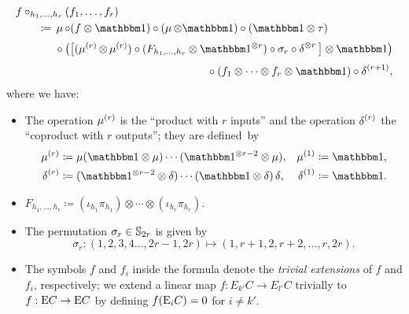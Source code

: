 \documentclass[\MainFolder/Text.tex]{subfiles}
\begin{document}
\begin{Definition}
\begin{equation} \label{Eq:CompositionFormula}
\begin{aligned}
&f\circ_{h_1, \dotsc, h_r}(f_1, \dotsc, f_r)\\
&\qquad \coloneqq \begin{multlined}[t]
\Prod\circ (f\otimes \Id)\circ(\Prod\otimes\Id)\circ(\Id\otimes \tau) \\[\jot] \circ \big(\big[(\Prod^{(r)}\otimes \Prod^{(r)})\circ (F_{h_1,\dotsc,h_r} \otimes \Id^{\otimes r})\circ \sigma_r\circ \CoProd^{\otimes r}\big] \otimes \Id \big) \\[\jot] \circ (f_1\otimes \dotsb \otimes f_r\otimes \Id)\circ\CoProd^{(r+1)},
\end{multlined}\end{aligned}
\end{equation}
where we have:
\begin{itemize}
\item The operation $\operatorname{\mu}^{(r)}$ is the ``product with $r$ inputs'' and the operation $\operatorname{\delta}^{(r)}$ the ``coproduct with $r$ outputs''; they are defined~by
\begin{align*}
\Prod^{(r)} &\coloneqq \Prod(\Id \otimes \Prod)\dotsb(\Id^{\otimes r-2} \otimes \Prod), & \Prod^{(1)}&\coloneqq \Id,\\
\CoProd^{(r)} &\coloneqq (\Id^{\otimes r-2} \otimes \CoProd)\dotsb(\Id \otimes \CoProd)\CoProd, &\CoProd^{(1)}&\coloneqq \Id.
\end{align*}

\item $F_{h_1,\dotsc, h_r} \coloneqq (\iota_{h_1}\pi_{h_1}) \otimes \dotsb \otimes (\iota_{h_r}\pi_{h_r})$.%
\item The permutation $\sigma_r \in \mathbb{S}_{2r}$ is given by  
\[\sigma_r: (1,2,3,4\dotsc, 2r-1, 2r) \longmapsto (1,r+1,2,r+2, \dotsc, r, 2r).\]
\item The symbols $f$ and $f_i$ inside the formula denote the \emph{trivial extensions} of $f$ and $f_i$, respectively; we extend a linear map $f: E_{k'} C \rightarrow E_{l'} C$ trivially to $f: \mathrm{E} C \rightarrow \mathrm{E} C$ by defining $f(\mathrm{E}_i C)=0$ for $i\neq k'$.
\end{itemize}
\end{Definition}
\end{document}

